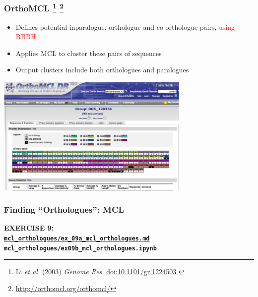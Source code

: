 % 
\begin{frame}
  \frametitle{OrthoMCL
    \footnote{\tiny{Li \textit{et al.} (2003) \textit{Genome Res.} \href{http://dx.doi.org/10.1101/gr.1224503
}{doi:10.1101/gr.1224503
    }}}
    \footnote{\tiny \href{http://orthomcl.org/orthomcl/}{http://orthomcl.org/orthomcl/}
    }
  }
  \begin{itemize}
    \item Defines potential inparalogue, orthologue and co-orthologue pairs, \textcolor{red}{using RBBH}
    \item \textcolor{hutton_green}{Applies MCL to cluster these pairs of sequences}
    \item \textcolor{hutton_blue}{Output clusters include both orthologues and paralogues}
  \end{itemize}  
  \begin{center}
      \includegraphics[width=0.7\textwidth]{images/orthomcl}
  \end{center}
\end{frame}

%
\begin{frame}
  \frametitle{Finding ``Orthologues'': MCL}
  \Large{
    \textcolor{hutton_blue}{
      \textbf{
      EXERCISE 9: \\
      {\small \href{https://github.com/widdowquinn/Teaching-2015-03-17-UoD_compgenvis/blob/master/exercises/mcl_orthologues/ex09a_mcl_orthologues.md}{\texttt{mcl\_orthologues/ex\_09a\_mcl\_orthologues.md}} \\
      \texttt{mcl\_orthologues/ex09b\_mcl\_orthologues.ipynb}}
      }
    }
  }
\end{frame}